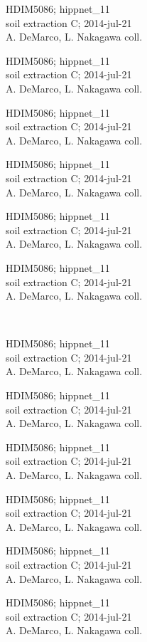 \documentclass[2pt]{extarticle}
\begin{document}
\noindent
\parbox{0.16\textwidth}{\tiny \raggedright \rule[-0.3\baselineskip]{0pt}{10pt}HDIM5086; hippnet\_11\\ soil extraction C; 2014-jul-21\\ A. DeMarco, L. Nakagawa coll.}
\parbox{0.16\textwidth}{\tiny \raggedright \rule[-0.3\baselineskip]{0pt}{10pt}HDIM5086; hippnet\_11\\ soil extraction C; 2014-jul-21\\ A. DeMarco, L. Nakagawa coll.}
\parbox{0.16\textwidth}{\tiny \raggedright \rule[-0.3\baselineskip]{0pt}{10pt}HDIM5086; hippnet\_11\\ soil extraction C; 2014-jul-21\\ A. DeMarco, L. Nakagawa coll.}
\parbox{0.16\textwidth}{\tiny \raggedright \rule[-0.3\baselineskip]{0pt}{10pt}HDIM5086; hippnet\_11\\ soil extraction C; 2014-jul-21\\ A. DeMarco, L. Nakagawa coll.}
\parbox{0.16\textwidth}{\tiny \raggedright \rule[-0.3\baselineskip]{0pt}{10pt}HDIM5086; hippnet\_11\\ soil extraction C; 2014-jul-21\\ A. DeMarco, L. Nakagawa coll.}
\parbox{0.16\textwidth}{\tiny \raggedright \rule[-0.3\baselineskip]{0pt}{10pt}HDIM5086; hippnet\_11\\ soil extraction C; 2014-jul-21\\ A. DeMarco, L. Nakagawa coll.} \\ 
\vspace{0.001in} 

\noindent
\parbox{0.16\textwidth}{\tiny \raggedright \rule[-0.3\baselineskip]{0pt}{10pt}HDIM5086; hippnet\_11\\ soil extraction C; 2014-jul-21\\ A. DeMarco, L. Nakagawa coll.}
\parbox{0.16\textwidth}{\tiny \raggedright \rule[-0.3\baselineskip]{0pt}{10pt}HDIM5086; hippnet\_11\\ soil extraction C; 2014-jul-21\\ A. DeMarco, L. Nakagawa coll.}
\parbox{0.16\textwidth}{\tiny \raggedright \rule[-0.3\baselineskip]{0pt}{10pt}HDIM5086; hippnet\_11\\ soil extraction C; 2014-jul-21\\ A. DeMarco, L. Nakagawa coll.}
\parbox{0.16\textwidth}{\tiny \raggedright \rule[-0.3\baselineskip]{0pt}{10pt}HDIM5086; hippnet\_11\\ soil extraction C; 2014-jul-21\\ A. DeMarco, L. Nakagawa coll.}
\parbox{0.16\textwidth}{\tiny \raggedright \rule[-0.3\baselineskip]{0pt}{10pt}HDIM5086; hippnet\_11\\ soil extraction C; 2014-jul-21\\ A. DeMarco, L. Nakagawa coll.}
\parbox{0.16\textwidth}{\tiny \raggedright \rule[-0.3\baselineskip]{0pt}{10pt}HDIM5086; hippnet\_11\\ soil extraction C; 2014-jul-21\\ A. DeMarco, L. Nakagawa coll.} \\ 
\vspace{0.001in} 
\end{document}
